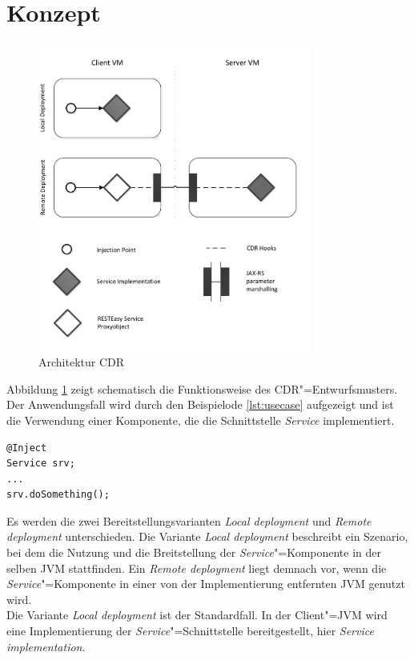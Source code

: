 \section{Konzept}
\begin{figure}[t]
\centering
\includegraphics[width=0.8\textwidth]{img/CDR}
\caption{Architektur CDR\label{pic:cdr}}
\end{figure}
Abbildung \ref{pic:cdr} zeigt schematisch die Funktionsweise des \ac{CDR}"=Entwurfsmusters. Der Anwendungsfall wird durch den Beispielode \ref{lst:usecase} aufgezeigt und ist die Verwendung einer Komponente, die die Schnittstelle \textit{Service} implementiert.
\begin{lstlisting}[caption={Anwendungsfall CDR"=Entwurfsmuster},captionpos=b,label=lst:usecase] 
@Inject
Service srv;
...
srv.doSomething();
\end{lstlisting}
Es werden die zwei Bereitstellungsvarianten \textit{Local deployment} und \textit{Remote deployment} unterschieden. 
Die Variante \textit{Local deployment} beschreibt ein Szenario, bei dem die Nutzung und die Breitstellung der \textit{Service}"=Komponente in der selben \ac{JVM} stattfinden. Ein \textit{Remote deployment} liegt demnach vor, wenn die \textit{Service}"=Komponente in einer von der Implementierung entfernten \ac{JVM} genutzt wird.\\ 
Die Variante \textit{Local deployment} ist der Standardfall. 
In der Client"=\ac{JVM} wird eine Implementierung der \textit{Service}"=Schnittstelle bereitgestellt, hier \textit{Service implementation}. 

